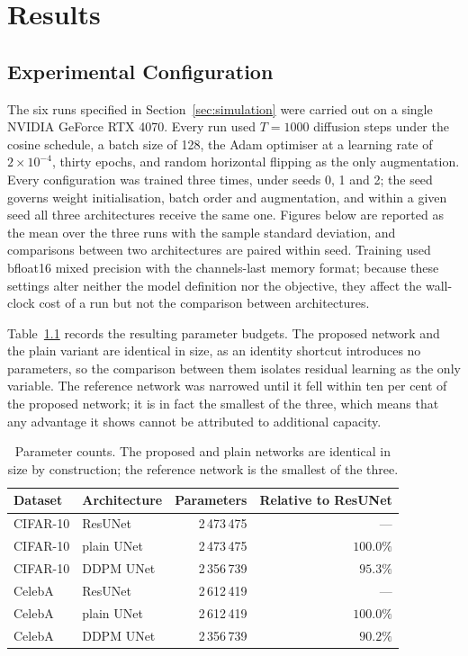 \chapter{Results}
\label{ch3}

\section{Experimental Configuration}

The six runs specified in Section~\ref{sec:simulation} were carried out on a single NVIDIA GeForce
RTX 4070. Every run used $T = 1000$ diffusion steps under the cosine schedule, a batch size of 128,
the Adam optimiser at a learning rate of $2 \times 10^{-4}$, thirty epochs, and random horizontal
flipping as the only augmentation. Every configuration was trained three times, under seeds 0, 1 and
2; the seed governs weight initialisation, batch order and augmentation, and within a given seed all
three architectures receive the same one. Figures below are reported as the mean over the three runs
with the sample standard deviation, and comparisons between two architectures are paired within
seed. Training used bfloat16 mixed precision with the channels-last memory format; because these
settings alter neither the model definition nor the objective, they affect the wall-clock cost of a
run but not the comparison between architectures.

Table~\ref{tab:params} records the resulting parameter budgets. The proposed network and the plain
variant are identical in size, as an identity shortcut introduces no parameters, so the comparison
between them isolates residual learning as the only variable. The reference network was narrowed
until it fell within ten per cent of the proposed network; it is in fact the smallest of the three,
which means that any advantage it shows cannot be attributed to additional capacity.

\begin{table}[htbp]
    \centering
    \caption{Parameter counts. The proposed and plain networks are identical in size by
    construction; the reference network is the smallest of the three.}
    \label{tab:params}
    \begin{tabular}{llrr}
        \toprule
        Dataset & Architecture & Parameters & Relative to ResUNet \\
        \midrule
        CIFAR-10 & ResUNet    & 2\,473\,475 & --- \\
        CIFAR-10 & plain UNet & 2\,473\,475 & $100.0\%$ \\
        CIFAR-10 & DDPM UNet  & 2\,356\,739 & $95.3\%$ \\
        \midrule
        CelebA   & ResUNet    & 2\,612\,419 & --- \\
        CelebA   & plain UNet & 2\,612\,419 & $100.0\%$ \\
        CelebA   & DDPM UNet  & 2\,356\,739 & $90.2\%$ \\
        \bottomrule
    \end{tabular}
\end{table}


